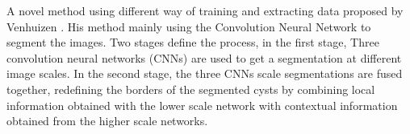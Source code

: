A novel method using different way of training and extracting data proposed by Venhuizen \cite{venhuizen2015autCNN}.
His method mainly using the Convolution Neural Network to segment the images.
Two stages define the process, in the first stage, Three convolution neural networks (CNNs) are used to get a segmentation at different image scales.
In the second stage, the three CNNs scale segmentations are fused together, redefining the borders of the segmented cysts by combining local information obtained with the lower scale network with contextual information obtained from the higher scale networks.





%
%


